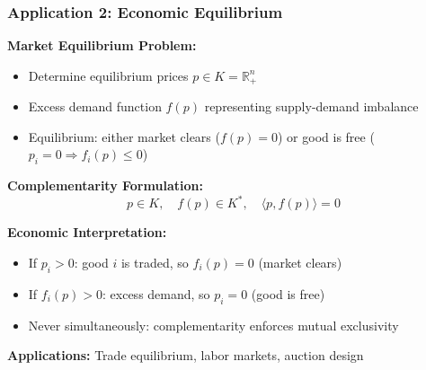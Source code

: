 \documentclass[aspectratio=169,10pt]{beamer}
\begin{document}
\begin{frame}
\frametitle{Application 2: Economic Equilibrium}

\textbf{Market Equilibrium Problem:}
\begin{itemize}
    \item Determine equilibrium prices $p \in K = {\mathbb{R}}^n_+$
    \item Excess demand function $f(p)$ representing supply-demand imbalance
    \item Equilibrium: either market clears ($f(p) = 0$) or good is free ($p_i = 0 \Rightarrow f_i(p) \leq 0$)
\end{itemize}

\vspace{0.3cm}

\textbf{Complementarity Formulation:}
$$p \in K, \quad f(p) \in K^*, \quad \langle p, f(p) \rangle = 0$$

\vspace{0.3cm}

\textbf{Economic Interpretation:}
\begin{itemize}
    \item If $p_i > 0$: good $i$ is traded, so $f_i(p) = 0$ (market clears)
    \item If $f_i(p) > 0$: excess demand, so $p_i = 0$ (good is free)
    \item Never simultaneously: complementarity enforces mutual exclusivity
\end{itemize}

\vspace{0.3cm}

\textbf{Applications:} Trade equilibrium, labor markets, auction design

\end{frame}
\end{document}
